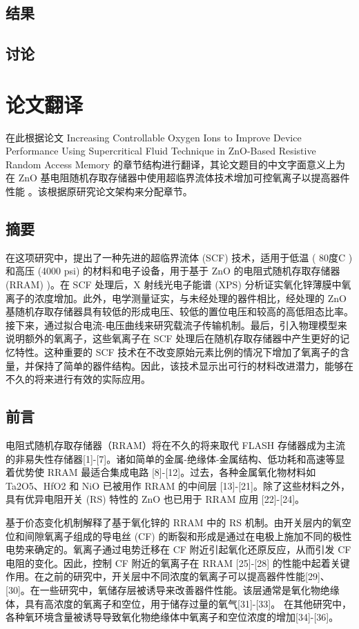 \subsection{结果}

\subsection{讨论}

\section{论文翻译}

在此根据论文 Increasing Controllable Oxygen Ions to Improve Device Performance Using Supercritical Fluid Technique in ZnO-Based Resistive Random Access Memory  的章节结构进行翻译，其论文题目的中文字面意义上为在 ZnO 基电阻随机存取存储器中使用超临界流体技术增加可控氧离子以提高器件性能 。该根据原研究论文架构来分配章节。

\subsection{摘要}

在这项研究中，提出了一种先进的超临界流体 (SCF) 技术，适用于低温 ( 80度C ) 和高压 (4000 psi) 的材料和电子设备，用于基于 ZnO 的电阻式随机存取存储器 (RRAM) )。在 SCF 处理后，X 射线光电子能谱 (XPS) 分析证实氧化锌薄膜中氧离子的浓度增加。此外，电学测量证实，与未经处理的器件相比，经处理的 ZnO 基随机存取存储器具有较低的形成电压、较低的置位电压和较高的高低阻态比率。接下来，通过拟合电流-电压曲线来研究载流子传输机制。最后，引入物理模型来说明额外的氧离子，这些氧离子在 SCF 处理后在随机存取存储器中产生更好的记忆特性。这种重要的 SCF 技术在不改变原始元素比例的情况下增加了氧离子的含量，并保持了简单的器件结构。因此，该技术显示出可行的材料改进潜力，能够在不久的将来进行有效的实际应用。

\subsection{前言}

电阻式随机存取存储器（RRAM）将在不久的将来取代 FLASH 存储器成为主流的非易失性存储器[1]-[7]。诸如简单的金属-绝缘体-金属结构、低功耗和高速等显着优势使 RRAM 最适合集成电路 [8]-[12]。过去，各种金属氧化物材料如 Ta2O5、HfO2 和 NiO 已被用作 RRAM 的中间层 [13]-[21]。除了这些材料之外，具有优异电阻开关 (RS) 特性的 ZnO 也已用于 RRAM 应用 [22]-[24]。

基于价态变化机制解释了基于氧化锌的 RRAM 中的 RS 机制。由开关层内的氧空位和间隙氧离子组成的导电丝 (CF) 的断裂和形成是通过在电极上施加不同的极性电势来确定的。氧离子通过电势迁移在 CF 附近引起氧化还原反应，从而引发 CF 电阻的变化。因此，控制 CF 附近的氧离子在 RRAM [25]-[28] 的性能中起着关键作用。在之前的研究中，开关层中不同浓度的氧离子可以提高器件性能[29]、[30]。在一些研究中，氧储存层被诱导来改善器件性能。该层通常是氧化物绝缘体，具有高浓度的氧离子和空位，用于储存过量的氧气[31]-[33]。
在其他研究中，各种氧环境含量被诱导导致氧化物绝缘体中氧离子和空位浓度的增加[34]-[36]。

